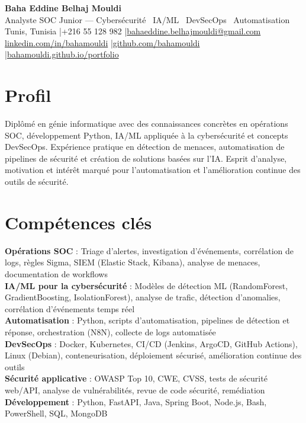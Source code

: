 \documentclass[a4paper,9pt]{article}
\begin{document}
\begin{center}
{\LARGE\bfseries\color{navy} Baha Eddine Belhaj Mouldi}\\[2pt]
{\normalsize\color{navy} Analyste SOC Junior --- Cybersécurité \textbar\ IA/ML \textbar\ DevSecOps \textbar\ Automatisation}\\[3pt]
{\small Tunis, Tunisia \quad|\quad +216 55 128 982 \quad|\quad \href{mailto:bahaeddine.belhajmouldi@gmail.com}{bahaeddine.belhajmouldi@gmail.com}}\\[1pt]
{\small \href{https://www.linkedin.com/in/bahamouldi}{linkedin.com/in/bahamouldi} \quad|\quad \href{https://github.com/bahamouldi}{github.com/bahamouldi} \quad|\quad \href{https://bahamouldi.github.io/portfolio/}{bahamouldi.github.io/portfolio}}
\end{center}
\vspace{1pt}
\section{Profil}
Diplômé en génie informatique avec des connaissances concrètes en opérations SOC, développement Python, IA/ML appliquée à la cybersécurité et concepts DevSecOps. Expérience pratique en détection de menaces, automatisation de pipelines de sécurité et création de solutions basées sur l'IA. Esprit d'analyse, motivation et intérêt marqué pour l'automatisation et l'amélioration continue des outils de sécurité.
\section{Compétences clés}
\textbf{Opérations SOC} : Triage d'alertes, investigation d'événements, corrélation de logs, règles Sigma, SIEM (Elastic Stack, Kibana), analyse de menaces, documentation de workflows\\[0.3pt]
\textbf{IA/ML pour la cybersécurité} : Modèles de détection ML (RandomForest, GradientBoosting, IsolationForest), analyse de trafic, détection d'anomalies, corrélation d'événements temps réel\\[0.3pt]
\textbf{Automatisation} : Python, scripts d'automatisation, pipelines de détection et réponse, orchestration (N8N), collecte de logs automatisée\\[0.3pt]
\textbf{DevSecOps} : Docker, Kubernetes, CI/CD (Jenkins, ArgoCD, GitHub Actions), Linux (Debian), conteneurisation, déploiement sécurisé, amélioration continue des outils\\[0.3pt]
\textbf{Sécurité applicative} : OWASP Top 10, CWE, CVSS, tests de sécurité web/API, analyse de vulnérabilités, revue de code sécurité, remédiation\\[0.3pt]
\textbf{Développement} : Python, FastAPI, Java, Spring Boot, Node.js, Bash, PowerShell, SQL, MongoDB
\end{document}
